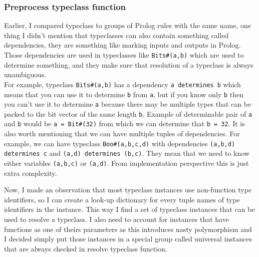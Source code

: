 \documentclass[12pt]{report}
\begin{document}
\subsubsection{Preprocess typeclass function}
Earlier, I compared typeclass to groups of Prolog rules with the same name, one thing I didn't mention that typeclasses can also contain something called dependencies, they are something like marking inputs and outputs in Prolog. Those dependencies are used in typeclasses like \verb!Bits#(a,b)! which are used to determine something, and they make sure that resolution of a typeclass is always unambiguous. \\
For example, typeclass \verb!Bits#(a,b)! has a dependency \verb!a determines b! which means that you can use it to determine \verb!b! from \verb!a!, but if you know only \verb!b! then you can't use it to determine \verb!a! because there may be multiple types that can be packed to the bit vector of the same length \verb!b!. Example of determinable pair of \verb!a! and \verb!b! would be  \verb!a = Bit#(32)! from which we can determine that \verb!b = 32!. It is also worth mentioning that we can have multiple tuples of dependencies. For example, we can have typeclass \verb!Boo#(a,b,c,d)! with dependencies \verb!(a,b,d) determines c! and \verb!(a,d) determines (b,c)!. They mean that we need to know either variables \verb!(a,b,c)! or \verb!(a,d)!. From implementation perspective this is just extra complexity.  
\par 
Now, I made an observation that most typeclass instances use non-function type identifiers, so I can create a look-up dictionary for every tuple names of type identifiers in the instance. This way I find a set of typeclass instances that can be used to resolve a typeclass. I also need to account for instances that have functions as one of theirs parameters as this introduces nasty polymorphism and I decided simply put those instances in a special group called universal instances that are always checked in resolve typeclass function. 
\end{document}
